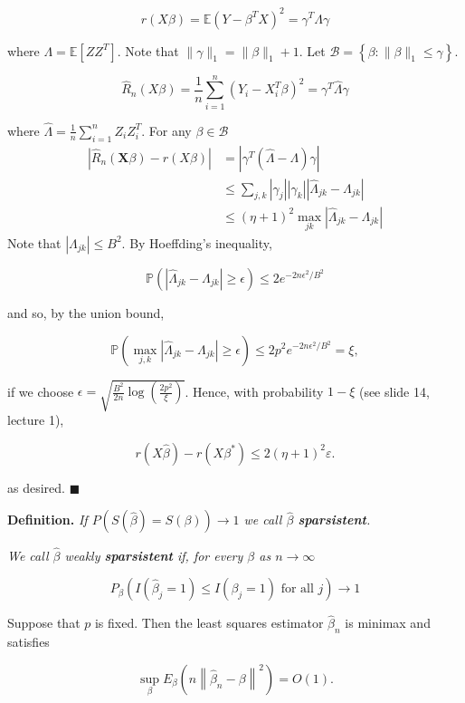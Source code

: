 \documentclass[
]{book}
\begin{document}
\[
r(X\beta)=\mathbb{E}\left(Y-\beta^T X\right)^2=\gamma^T \Lambda \gamma
\]

where \(\Lambda=\mathbb{E}\left[Z Z^T\right]\). Note that \(\|\gamma\|_1=\|\beta\|_1+1\). Let \(\mathcal{B}=\left\{\beta:\|\beta\|_1 \leq \gamma\right\}\).

\[
\hat{R}_n( X\beta)=\frac{1}{n} \sum_{i=1}^n\left(Y_i-X_i^T \beta\right)^2=\gamma^T \widehat{\Lambda} \gamma
\]

where \(\widehat{\Lambda}=\frac{1}{n} \sum_{i=1}^n Z_i Z_i^T\). For any \(\beta \in \mathcal{B}\)
\begin{align*}
|\hat{R}_n(\mathbf X\beta)-r(X\beta)| & =\left|\gamma^T(\widehat{\Lambda}-\Lambda) \gamma\right| \\
& \leq \sum_{j, k}|\gamma_j||\gamma_k||\widehat{\Lambda}_{j k}-\Lambda_{jk}| \\
& \leq(\eta+1)^2 \max_{jk} |\widehat{\Lambda}_{j k}-\Lambda_{jk}|
\end{align*}
Note that \(|\Lambda_{jk}| \leq B^2\). By Hoeffding's inequality,

\[
\mathbb{P}\left( |\widehat{\Lambda}_{j k}-\Lambda_{jk}|\geq \epsilon\right) \leq 2 e^{-2n \epsilon^2 / B^2}
\]

and so, by the union bound,

\[
\mathbb{P}\left(\max _{j, k}|\widehat{\Lambda}_{j k}-\Lambda_{j k}| \geq \epsilon\right) \leq 2 p^2 e^{-2n \epsilon^2 / B^2}=\xi,
\]

if we choose \(\epsilon=\sqrt{\frac{B^2} {2 n} \log \left(\frac{{2} p^2}{{ \xi}}\right)}\).
Hence, with probability \(1-\xi\) (see slide 14, lecture 1),

\[
r({X \hat\beta}) - r\left(X\beta^*\right)\leq 2(\eta+1)^2 \varepsilon. 
\]

as desired. \(\blacksquare\)

\textbf{Definition.} \emph{If \(P(S(\widehat{\beta})=S(\beta)) \rightarrow 1\) we call \(\hat \beta\) \textbf{sparsistent}.}

\emph{We call \(\hat{\beta}\) weakly \textbf{sparsistent} if, for every \(\beta\) as \(n \rightarrow \infty\) }

\[
P_\beta\left(I\left(\widehat{\beta}_j=1\right) \leq I\left(\beta_j=1\right) \text { for all } j\right) \rightarrow 1
\]

Suppose that \(p\) is fixed. Then the least squares estimator \(\widehat{\beta}_n\) is minimax and satisfies

\[
\sup _\beta E_\beta\left(n\left\|\widehat{\beta}_n-\beta\right\|^2\right)=O(1) .
\]
\end{document}
